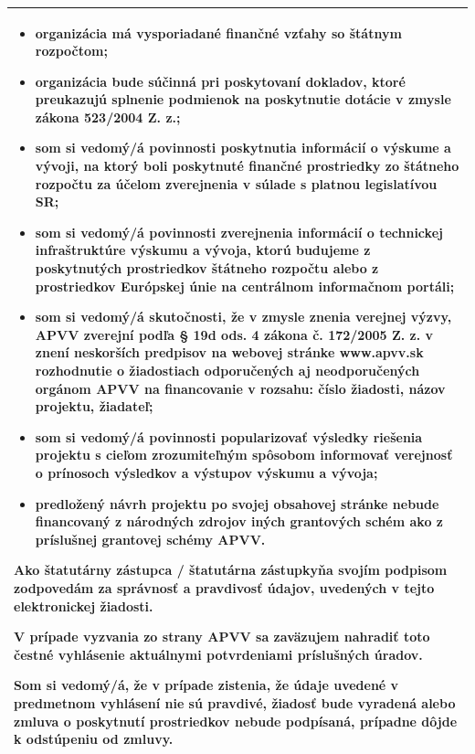 \documentclass[9pt,a4paper]{extarticle}
\begin{document}
\begin{tabularx}{\textwidth}{|X|}
\begin{itemize}[leftmargin=12mm,itemsep=0pt,parsep=0pt,topsep=2pt]
\item organizácia má vysporiadané finančné vzťahy so štátnym rozpočtom;
\item organizácia bude súčinná pri poskytovaní dokladov, ktoré preukazujú splnenie podmienok na poskytnutie dotácie v zmysle zákona 523/2004 Z. z.;
\item som si vedomý/á povinnosti poskytnutia informácií o výskume a vývoji, na ktorý boli poskytnuté finančné prostriedky zo štátneho rozpočtu za účelom zverejnenia v súlade s platnou legislatívou SR;
\item som si vedomý/á povinnosti zverejnenia informácií o technickej infraštruktúre výskumu a vývoja, ktorú budujeme z poskytnutých prostriedkov štátneho rozpočtu alebo z prostriedkov Európskej únie na centrálnom informačnom portáli;
\item som si vedomý/á skutočnosti, že v zmysle znenia verejnej výzvy, APVV zverejní podľa § 19d ods. 4 zákona č. 172/2005 Z. z. v znení neskorších predpisov na webovej stránke www.apvv.sk rozhodnutie o žiadostiach odporučených aj neodporučených orgánom APVV na financovanie v rozsahu: číslo žiadosti, názov projektu, žiadateľ;
\item som si vedomý/á povinnosti popularizovať výsledky riešenia projektu s cieľom zrozumiteľným spôsobom informovať verejnosť o prínosoch výsledkov a výstupov výskumu a vývoja;
\item predložený návrh projektu po svojej obsahovej stránke nebude financovaný z národných zdrojov iných grantových schém ako z príslušnej grantovej schémy APVV.
\end{itemize}
\smallskip\textbf{Ako štatutárny zástupca / štatutárna zástupkyňa svojím podpisom zodpovedám za správnosť a pravdivosť údajov, uvedených v tejto elektronickej žiadosti.}

\smallskip V prípade vyzvania zo strany APVV sa zaväzujem nahradiť toto čestné vyhlásenie aktuálnymi potvrdeniami príslušných úradov.

\smallskip Som si vedomý/á, že v prípade zistenia, že údaje uvedené v predmetnom vyhlásení nie sú pravdivé, žiadosť bude vyradená alebo zmluva o poskytnutí prostriedkov nebude podpísaná, prípadne dôjde k odstúpeniu od zmluvy.

\smallskip{\footnotesize * len v prípade povinnosti spolufinancovať projekt}\\[2pt]\hline
\end{tabularx}\par\vspace{-1pt}
\end{document}
